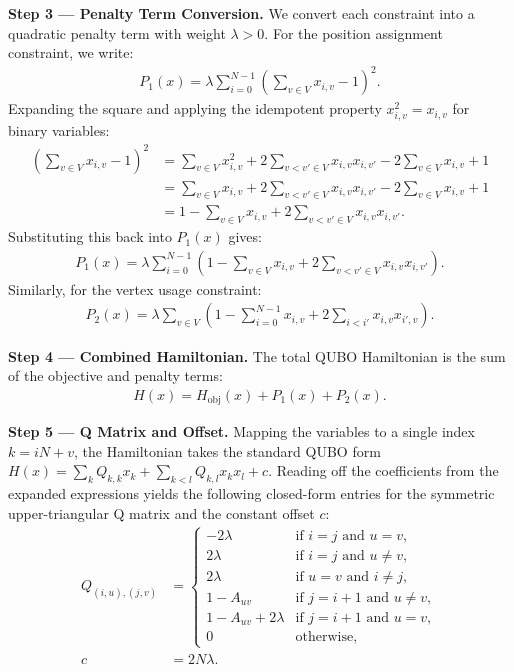 \documentclass[12pt]{article}
\begin{document}
\textbf{Step 3 --- Penalty Term Conversion.} We convert each constraint into a quadratic penalty term with weight $\lambda > 0$. For the position assignment constraint, we write:
\begin{align}
P_1(x) = \lambda \sum_{i=0}^{N-1} \left( \sum_{v \in V} x_{i,v} - 1 \right)^2.
\end{align}
Expanding the square and applying the idempotent property $x_{i,v}^2 = x_{i,v}$ for binary variables:
\begin{align}
\left( \sum_{v \in V} x_{i,v} - 1 \right)^2 &= \sum_{v \in V} x_{i,v}^2 + 2 \sum_{v < v' \in V} x_{i,v} x_{i,v'} - 2 \sum_{v \in V} x_{i,v} + 1 \\
&= \sum_{v \in V} x_{i,v} + 2 \sum_{v < v' \in V} x_{i,v} x_{i,v'} - 2 \sum_{v \in V} x_{i,v} + 1 \\
&= 1 - \sum_{v \in V} x_{i,v} + 2 \sum_{v < v' \in V} x_{i,v} x_{i,v'}.
\end{align}
Substituting this back into $P_1(x)$ gives:
\begin{align}
P_1(x) = \lambda \sum_{i=0}^{N-1} \left( 1 - \sum_{v \in V} x_{i,v} + 2 \sum_{v < v' \in V} x_{i,v} x_{i,v'} \right).
\end{align}
Similarly, for the vertex usage constraint:
\begin{align}
P_2(x) = \lambda \sum_{v \in V} \left( 1 - \sum_{i=0}^{N-1} x_{i,v} + 2 \sum_{i < i'} x_{i,v} x_{i',v} \right).
\end{align}

\textbf{Step 4 --- Combined Hamiltonian.} The total QUBO Hamiltonian is the sum of the objective and penalty terms:
\begin{align}
H(x) = H_{\text{obj}}(x) + P_1(x) + P_2(x).
\end{align}

\textbf{Step 5 --- Q Matrix and Offset.} Mapping the variables to a single index $k = iN + v$, the Hamiltonian takes the standard QUBO form $H(x) = \sum_{k} Q_{k,k} x_k + \sum_{k < l} Q_{k,l} x_k x_l + c$. Reading off the coefficients from the expanded expressions yields the following closed-form entries for the symmetric upper-triangular Q matrix and the constant offset $c$:
\begin{align}
Q_{(i,u),(j,v)} &= 
\begin{cases} 
-2\lambda & \text{if } i=j \text{ and } u=v, \\
2\lambda & \text{if } i=j \text{ and } u \neq v, \\
2\lambda & \text{if } u=v \text{ and } i \neq j, \\
1 - A_{uv} & \text{if } j = i+1 \text{ and } u \neq v, \\
1 - A_{uv} + 2\lambda & \text{if } j = i+1 \text{ and } u = v, \\
0 & \text{otherwise},
\end{cases} \\
c &= 2N\lambda.
\end{align}
\end{document}
